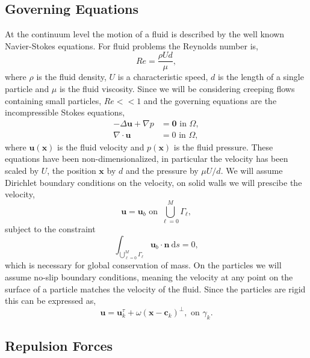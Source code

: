 \documentclass[preprint, 10pt]{elsarticle}
\begin{document}
\subsection{Governing Equations}\label{sec:governing}
At the continuum level the motion of a fluid is described by the well known Navier-Stokes equations. For fluid problems the Reynolds number is,
\[ Re = \frac{\rho Ud}{\mu},\]
where $\rho$ is the fluid density, $U$ is a characteristic speed, $d$ is the length of a single particle and $\mu$ is the fluid viscosity. Since we will be considering creeping flows containing small particles, $Re << 1$ and the governing equations are the incompressible Stokes equations,
\begin{subequations}\label{eq:stokes}
\begin{align}
	-\Delta \mathbf{u} + \nabla p &= \mathbf{0} \text{ in }\Omega,\\
	\nabla\cdot\mathbf{u} &= 0 \text{ in }\Omega,
\end{align}
\end{subequations}
where $\mathbf{u}(\mathbf{x})$ is the fluid velocity and $p(\mathbf{x})$ is the fluid pressure. These equations have been non-dimensionalized, in particular the velocity has been scaled by $U$, the position $\mathbf{x}$ by $d$ and the pressure by $\mu U/d$.  We will assume Dirichlet boundary conditions on the velocity, on solid walls we will prescibe the velocity,
\begin{equation}\label{eq:boundary_condition}
	 \mathbf{u} = \mathbf{u}_b \text{ on } \bigcup\limits_{\ell = 0}^M \Gamma_\ell,\end{equation}
subject to the constraint 
\begin{equation}\label{eq:compatibility}
	 \int_{\bigcup\limits_{\ell=0}^M\Gamma_\ell} \mathbf{u}_b\cdot\mathbf{n}~\text{d}s = 0,
\end{equation}
which is necessary for global conservation of mass. On the particles we will assume no-slip boundary conditions, meaning the velocity at any point on the surface of a particle matches the velocity of the fluid. Since the particles are rigid this can be expressed as,
\[ \mathbf{u} = \mathbf{u}^\tau_k + \omega(\mathbf{x}-\mathbf{c}_k)^\perp, \text{ on }\gamma_k.\]



\subsection{Repulsion Forces}
\end{document}
